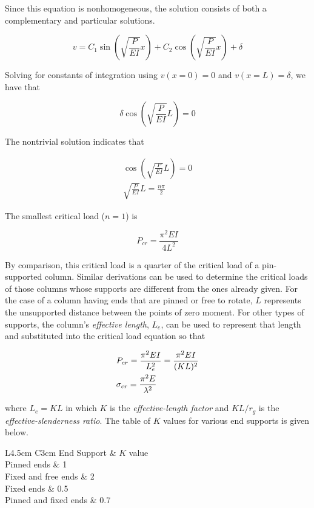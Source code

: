 \documentclass[a4paper,openany,12pt]{book}
\begin{document}
{{Since this equation is nonhomogeneous, the solution consists of both a
complementary and particular solutions.

$$v = C_1\sin \left( \sqrt {\frac{P}{EI}} x \right) + C_2\cos \left( \sqrt {\frac{P}{EI}} x \right) + \delta$$

Solving for constants of integration using \(v(x = 0) = 0\) and
\(v(x = L) = \delta\), we have that

$$\delta \cos \left( \sqrt {\frac{P}{EI}} L \right) = 0$$

The nontrivial solution indicates that

$$\begin{gathered}
  \cos \left( \sqrt {\frac{P}{EI}} L \right) = 0 \\
  \sqrt {\frac{P}{EI}} L = \frac{n\pi }{2}\end{gathered}$$

The smallest critical load (\(n = 1\)) is

$$P_{cr} = \frac{\pi^2EI}{4L^2}$$

By comparison, this critical load is a quarter of the critical load of a
pin-supported column. Similar derivations can be used to determine the
critical loads of those columns whose supports are different from the
ones already given. For the case of a column having ends that are pinned
or free to rotate, \(L\) represents the unsupported distance between the
points of zero moment. For other types of supports, the column's
\emph{effective length}, \(L_e\), can be used to represent that length and
substituted into the critical load equation so that

\begin{gather}
\label{eqn: Euler's formula}
  P_{cr} = \frac{\pi^2EI}{L_e^2} = \frac{\pi ^2EI}{(KL)^2} \hfill \\
  \sigma_{cr} = \frac{\pi ^2E}{\lambda^2} \hfill \\ 
\end{gather}

where \(L_e = KL\) in which \(K\) is the \emph{effective-length factor} and
\(KL/r_g\) is the \emph{effective-slenderness ratio}. The table of \(K\) values
for various end supports is given below.


 L4.5cm C3cm End Support \& \(K\) value\\
Pinned ends \& 1\\
Fixed and free ends \& 2\\
Fixed ends \& 0.5\\
Pinned and fixed ends \& 0.7\\

}}
\end{document}
